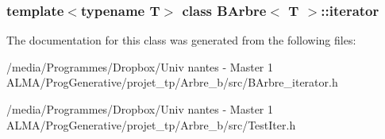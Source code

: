 \subsubsection*{template$<$typename T$>$ class BArbre$<$ T $>$::iterator}



The documentation for this class was generated from the following files:\begin{DoxyCompactItemize}
\item 
/media/Programmes/Dropbox/Univ nantes -\/ Master 1 ALMA/ProgGenerative/projet\_\-tp/Arbre\_\-b/src/BArbre\_\-iterator.h\item 
/media/Programmes/Dropbox/Univ nantes -\/ Master 1 ALMA/ProgGenerative/projet\_\-tp/Arbre\_\-b/src/TestIter.h\end{DoxyCompactItemize}
